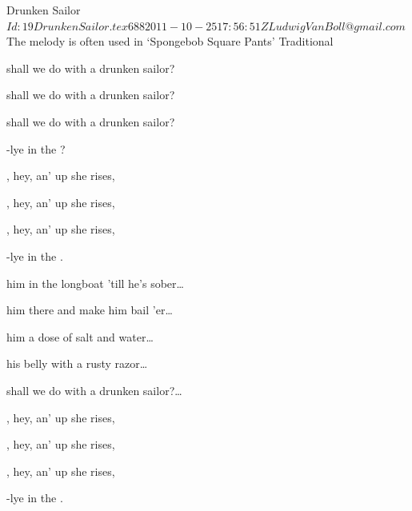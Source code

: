 \begin{SBSong}{Drunken Sailor}
  {$Id: 19DrunkenSailor.tex 688 2011-10-25 17:56:51Z LudwigVanBoll@gmail.com $}
  {The melody is often used in `Spongebob Square Pants'}
  {Traditional}
  \begin{SBVerse}
     shall we do with a drunken sailor? 

     shall we do with a drunken sailor? 

     shall we do with a drunken sailor? 

    -lye in the ? 
  \end{SBVerse}
  \begin{SBChorus}
    , hey, an' up she rises, 
    
    , hey, an' up she rises, 

    , hey, an' up she rises, 

    -lye in the . 
    
  \end{SBChorus}
  \begin{SBVerse}
     him in the longboat 'till he's sober\ldots 
  \end{SBVerse}
  \begin{SBVerse}
     him there and make him bail 'er\ldots 
  \end{SBVerse}
  \begin{SBVerse}
     him a dose of salt and water\ldots 
  \end{SBVerse}
  \begin{SBVerse}
     his belly with a rusty razor\ldots 
  \end{SBVerse}
  \begin{SBVerse}
     shall we do with a drunken sailor?\ldots 
  \end{SBVerse}
  \ifChordBk
  \begin{SBChorus}
    , hey, an' up she rises, 
    
    , hey, an' up she rises, 

    , hey, an' up she rises, 

    -lye in the .  
  \end{SBChorus}
  \fi
\end{SBSong}